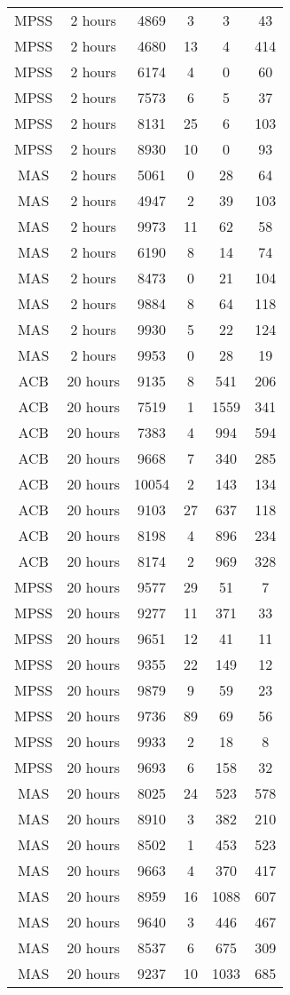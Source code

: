 \begin{center}
\begin{longtable}{cccccc}
MPSS	&	2 hours	&	4869	&	3	&	3	&	43	\\
MPSS	&	2 hours	&	4680	&	13	&	4	&	414	\\
MPSS	&	2 hours	&	6174	&	4	&	0	&	60	\\
MPSS	&	2 hours	&	7573	&	6	&	5	&	37	\\
MPSS	&	2 hours	&	8131	&	25	&	6	&	103	\\
MPSS	&	2 hours	&	8930	&	10	&	0	&	93	\\
MAS	&	2 hours	&	5061	&	0	&	28	&	64	\\
MAS	&	2 hours	&	4947	&	2	&	39	&	103	\\
MAS	&	2 hours	&	9973	&	11	&	62	&	58	\\
MAS	&	2 hours	&	6190	&	8	&	14	&	74	\\
MAS	&	2 hours	&	8473	&	0	&	21	&	104	\\
MAS	&	2 hours	&	9884	&	8	&	64	&	118	\\
MAS	&	2 hours	&	9930	&	5	&	22	&	124	\\
MAS	&	2 hours	&	9953	&	0	&	28	&	19	\\
ACB	&	20 hours	&	9135	&	8	&	541	&	206	\\
ACB	&	20 hours	&	7519	&	1	&	1559	&	341	\\
ACB	&	20 hours	&	7383	&	4	&	994	&	594	\\
ACB	&	20 hours	&	9668	&	7	&	340	&	285	\\
ACB	&	20 hours	&	10054	&	2	&	143	&	134	\\
ACB	&	20 hours	&	9103	&	27	&	637	&	118	\\
ACB	&	20 hours	&	8198	&	4	&	896	&	234	\\
ACB	&	20 hours	&	8174	&	2	&	969	&	328	\\
MPSS	&	20 hours	&	9577	&	29	&	51	&	7	\\
MPSS	&	20 hours	&	9277	&	11	&	371	&	33	\\
MPSS	&	20 hours	&	9651	&	12	&	41	&	11	\\
MPSS	&	20 hours	&	9355	&	22	&	149	&	12	\\
MPSS	&	20 hours	&	9879	&	9	&	59	&	23	\\
MPSS	&	20 hours	&	9736	&	89	&	69	&	56	\\
MPSS	&	20 hours	&	9933	&	2	&	18	&	8	\\
MPSS	&	20 hours	&	9693	&	6	&	158	&	32	\\
MAS	&	20 hours	&	8025	&	24	&	523	&	578	\\
MAS	&	20 hours	&	8910	&	3	&	382	&	210	\\
MAS	&	20 hours	&	8502	&	1	&	453	&	523	\\
MAS	&	20 hours	&	9663	&	4	&	370	&	417	\\
MAS	&	20 hours	&	8959	&	16	&	1088	&	607	\\
MAS	&	20 hours	&	9640	&	3	&	446	&	467	\\
MAS	&	20 hours	&	8537	&	6	&	675	&	309	\\
MAS	&	20 hours	&	9237	&	10	&	1033	&	685	\\

\end{longtable}    
\end{center}